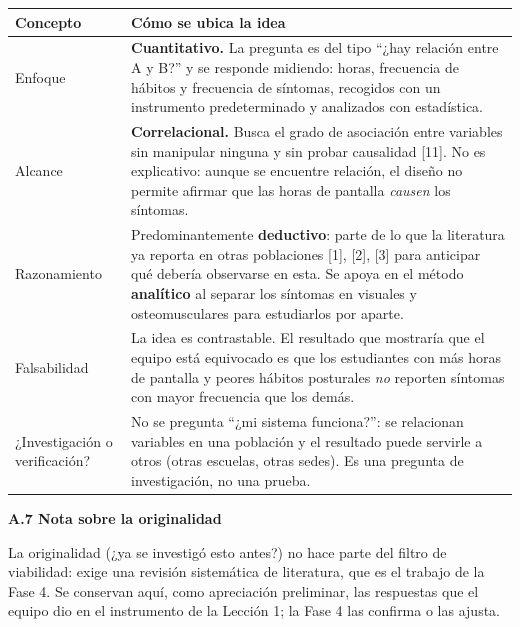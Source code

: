 \begin{center}
\begin{longtable}{L{3.3cm} L{11cm}}
\toprule
\textbf{Concepto} & \textbf{Cómo se ubica la idea}\\
\midrule
\endhead
Enfoque & \textbf{Cuantitativo.} La pregunta es del tipo ``¿hay relación entre A y
B?'' y se responde midiendo: horas, frecuencia de hábitos y frecuencia de síntomas,
recogidos con un instrumento predeterminado y analizados con estadística.\\
\midrule
Alcance & \textbf{Correlacional.} Busca el grado de asociación entre variables sin
manipular ninguna y sin probar causalidad [11]. No es explicativo: aunque se
encuentre relación, el diseño no permite afirmar que las horas de pantalla
\emph{causen} los síntomas.\\
\midrule
Razonamiento & Predominantemente \textbf{deductivo}: parte de lo que la literatura
ya reporta en otras poblaciones [1], [2], [3] para anticipar qué debería observarse
en esta. Se apoya en el método \textbf{analítico} al separar los síntomas en
visuales y osteomusculares para estudiarlos por aparte.\\
\midrule
Falsabilidad & La idea es contrastable. El resultado que mostraría que el equipo
está equivocado es que los estudiantes con más horas de pantalla y peores hábitos
posturales \emph{no} reporten síntomas con mayor frecuencia que los demás.\\
\midrule
¿Investigación o verificación? & No se pregunta ``¿mi sistema funciona?'': se
relacionan variables en una población y el resultado puede servirle a otros
(otras escuelas, otras sedes). Es una pregunta de investigación, no una prueba.\\
\bottomrule
\end{longtable}
\end{center}

\bigskip
\noindent\textbf{A.7 Nota sobre la originalidad}

\noindent La originalidad (¿ya se investigó esto antes?) no hace parte del filtro de
viabilidad: exige una revisión sistemática de literatura, que es el trabajo de la
Fase 4. Se conservan aquí, como apreciación preliminar, las respuestas que el equipo
dio en el instrumento de la Lección 1; la Fase 4 las confirma o las ajusta.

